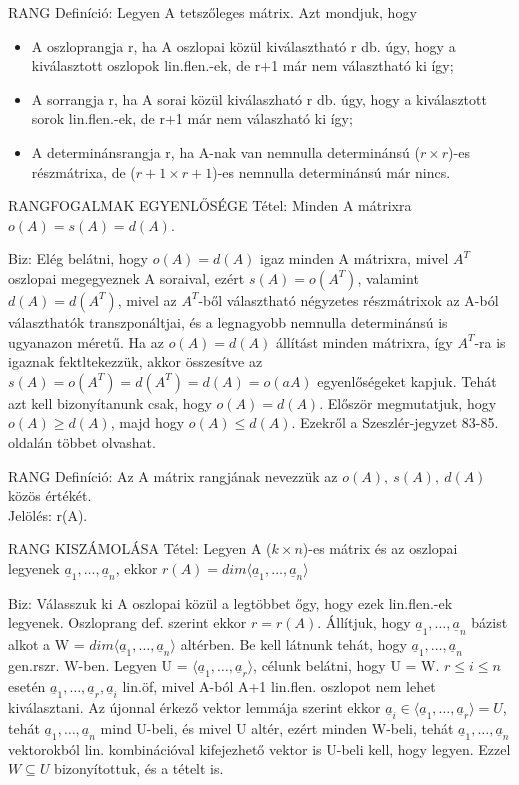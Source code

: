 \documentclass[]{article}
\newcommand{\Und}[1]{\underline{#1}}
\begin{document}
\begin{shaded}
RANG Definíció: Legyen A tetszőleges mátrix. Azt mondjuk, hogy
\begin{itemize}
\item A oszloprangja r, ha A oszlopai közül kiválasztható r db. úgy, hogy a kiválasztott oszlopok lin.flen.-ek, de r+1 már nem választható ki így;
\item A sorrangja r, ha A sorai közül kiválaszható r db. úgy, hogy a kiválasztott sorok lin.flen.-ek, de r+1 már nem válaszható ki így;
\item A determinánsrangja r, ha A-nak van nemnulla determinánsú ($r \times r$)-es részmátrixa, de ($r+1 \times r+1$)-es nemnulla determinánsú már nincs.
\end{itemize}
\end{shaded}
\begin{framed}
RANGFOGALMAK EGYENLŐSÉGE Tétel: Minden A mátrixra $o(A) = s(A) = d(A)$.
\end{framed}
\begin{leftbar}
Biz: Elég belátni, hogy $o(A) = d(A)$ igaz minden A mátrixra, mivel $A^T$ oszlopai megegyeznek A soraival, ezért $s(A) = o(A^T)$, valamint $d(A) = d(A^T)$, mivel az $A^T$-ből választható négyzetes részmátrixok az A-ból választhatók transzponáltjai, és a legnagyobb nemnulla determinánsú is ugyanazon méretű. Ha az $o(A) = d(A)$ állítást minden mátrixra, így $A^T$-ra is igaznak fektltekezzük, akkor összesítve az $s(A) = o(A^T) = d(A^T) = d(A) = o(aA)$ egyenlőségeket kapjuk. Tehát azt kell bizonyítanunk csak, hogy $o(A) = d(A)$. Először megmutatjuk, hogy $o(A) \geq d(A)$, majd hogy $o(A) \leq d(A)$. Ezekről a Szeszlér-jegyzet 83-85. oldalán többet olvashat.
\end{leftbar}
\begin{shaded}
RANG Definíció: Az A mátrix rangjának nevezzük az $o(A),\: s(A),\: d(A)$ közös értékét.\\
Jelölés: r(A).
\end{shaded}
\begin{framed}
RANG KISZÁMOLÁSA Tétel: Legyen A ($k \times n$)-es mátrix és az oszlopai legyenek $\Und{a}_1, \ldots, \Und{a}_n$, ekkor $r(A) = dim\langle\Und{a}_1, \ldots, \Und{a}_n\rangle$
\end{framed}
\begin{leftbar}
Biz: Válasszuk ki A oszlopai közül a legtöbbet őgy, hogy ezek lin.flen.-ek legyenek. Oszloprang def. szerint ekkor $r = r(A)$. Állítjuk, hogy $\Und{a}_1, \ldots, \Und{a}_n$ bázist alkot a W = $dim\langle\Und{a}_1, \ldots, \Und{a}_n\rangle$ altérben. Be kell látnunk tehát, hogy $\Und{a}_1, \ldots, \Und{a}_n$ gen.rszr. W-ben. Legyen U = $\langle\Und{a}_1, \ldots, \Und{a}_r\rangle$, célunk belátni, hogy U = W. $r \leq i \leq n$ esetén $\Und{a}_1, \ldots, \Und{a}_r, \Und{a}_i$ lin.öf, mivel A-ból A+1 lin.flen. oszlopot nem lehet kiválasztani. Az újonnal érkező vektor lemmája szerint ekkor $\Und{a}_i\in\langle\Und{a}_1, \ldots, \Und{a}_r\rangle = U$, tehát $\Und{a}_1, \ldots, \Und{a}_n$ mind U-beli, és mivel U altér, ezért minden W-beli, tehát $\Und{a}_1, \ldots, \Und{a}_n$ vektorokból lin. kombinációval kifejezhető vektor is U-beli kell, hogy legyen. Ezzel $W \subseteq U$ bizonyítottuk, és a tételt is.
\end{leftbar}
\end{document}
